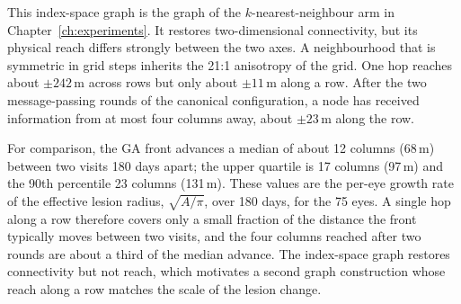This index-space graph is the graph of the $k$-nearest-neighbour arm in
Chapter~\ref{ch:experiments}. It restores two-dimensional connectivity,
but its physical reach differs strongly between the two axes. A
neighbourhood that is symmetric in grid steps inherits the 21:1 anisotropy
of the grid. One hop reaches about $\pm 242$\,\textmu{}m across rows but
only about $\pm 11$\,\textmu{}m along a row. After the two message-passing
rounds of the canonical configuration, a node has received information
from at most four columns away, about $\pm 23$\,\textmu{}m along the row.

For comparison, the GA front advances a median of about 12 columns
(68\,\textmu{}m) between two visits 180 days apart; the upper quartile is
17 columns (97\,\textmu{}m) and the 90th percentile 23 columns
(131\,\textmu{}m). These values are the per-eye growth rate of the
effective lesion radius, $\sqrt{A/\pi}$, over 180 days, for the 75 eyes. A single hop along a row therefore covers only a small
fraction of the distance the front typically moves between two visits, and
the four columns reached after two rounds are about a third of the median
advance. The index-space graph restores connectivity but not reach, which
motivates a second graph construction whose reach along a row matches the
scale of the lesion change.

